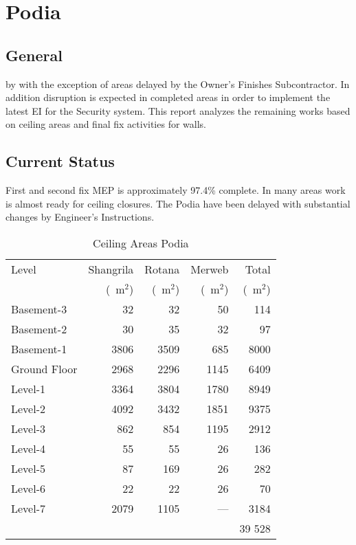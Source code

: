 \chapter{Podia}
\newcommand{\sm}{~m$^2$}

\section{General}
\normalsize
{} by with the exception of areas delayed by the Owner's Finishes Subcontractor. In addition disruption is expected in completed areas in order to implement the latest EI for the Security system. This report analyzes the remaining works based on
ceiling areas and final fix activities for walls.

\section{Current Status}

First and second fix MEP  is approximately 97.4\% complete. In many areas work is almost ready for ceiling closures. The Podia have been delayed with substantial changes by Engineer's Instructions. 

\begin{table}[htbp]
\begin{tabular}{lrrrr}
\toprule
Level		&Shangrila		&Rotana		&Merweb		&Total\\
~                      &(\sm)			&\hfil(\sm)\hfil                            &\hfil(\sm)\hfil                       &\hfil(\sm)\hfil\\
\midrule
Basement-3	&32 	&32 	&50 	&114\\
Basement-2	&30 	&35	&32	&97\\
Basement-1	&3806	&3509	&685 	&8000\\
Ground Floor &2968	&2296	&1145	&6409\\
Level-1		&3364	&3804	&1780	&8949\\
Level-2  	&4092	&3432	&1851	&9375\\
Level-3	 	&862	&854	&1195	&2912\\
Level-4		&55	&55	&26	&136\\
Level-5		&87	&169	&26	&282\\
Level-6		&22	&22	&26	&70\\
Level-7		&2079	&1105   	&---		&3184\\ \cline{5-5}
~		&	&		&		&39 528\\
\bottomrule
\end{tabular}								
\caption{Ceiling Areas Podia}
\label{tbl:ceilings}
\end{table}


